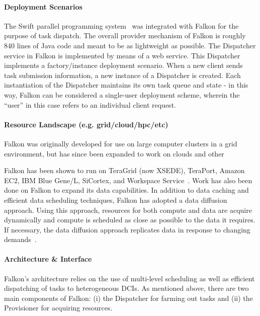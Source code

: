 \documentclass{sig-alternate}
\begin{document}
\paragraph{Deployment Scenarios}

The Swift parallel programming system~\cite{Wilde2011} was integrated
with Falkon for the purpose of task dispatch. The overall provider
mechanism of Falkon is roughly 840 lines of Java code and meant
to be as lightweight as possible. The Dispatcher service 
in Falkon is implemented by means of a web service. 
This Dispatcher implements a factory/instance deployment scenario.
When a new client sends task submission information, a new instance
of a Dispatcher is created. Each instantiation of the Dispatcher maintains
its own task queue and state - in this way, Falkon can be considered
a single-user deployment scheme, wherein the ``user'' in this case
refers to an individual client request.

\paragraph{Resource Landscape (e.g. grid/cloud/hpc/etc)}
Falkon was originally developed for use on large computer clusters
in a grid environment, but has since been expanded to work on
clouds and other 

Falkon has been 
shown to run on TeraGrid (now XSEDE), TeraPort, Amazon EC2, IBM
Blue Gene/L, SiCortex, and Workspace Service~\cite{1362680}.
 Work has also been done on Falkon
to expand its data capabilities. In addition to data caching and
efficient data scheduling techniques, Falkon has adopted a
data diffusion approach. Using this approach, resources for
both compute and data are acquire dynamically and compute
is scheduled as close as possible to the data it requires.
If necessary, the data diffusion approach replicates data
in response to changing demands~\cite{raicu2008accelerating}.


\paragraph{Architecture \& Interface}

Falkon's architecture relies on the use of multi-level scheduling
as well as efficient dispatching of tasks to heterogeneous DCIs.
As mentioned above, there are two main components of Falkon: 
(i) the Dispatcher for farming out tasks and 
(ii) the Provisioner for acquiring resources. 
\end{document}
